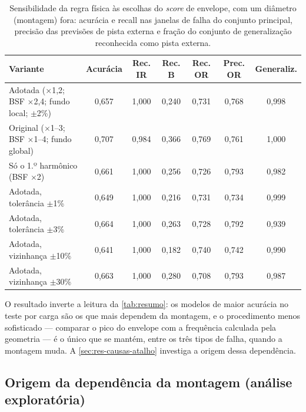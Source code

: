 \begin{table}[htb]
  \centering
  \caption{Sensibilidade da regra física às escolhas do \emph{score} de envelope,
  com um diâmetro (montagem) fora: acurácia e recall nas janelas de falha do
  conjunto principal, precisão das previsões de pista externa e fração do conjunto
  de generalização reconhecida como pista externa.}
  \label{tab:sensibilidade}
  \scriptsize
  \begin{tabular}{lcccccc}
    \toprule
    \textbf{Variante} & \textbf{Acurácia} & \textbf{Rec. IR} & \textbf{Rec. B} &
    \textbf{Rec. OR} & \textbf{Prec. OR} & \textbf{Generaliz.} \\
    \midrule
    Adotada ($\times$1,2; BSF $\times$2,4; fundo local; $\pm$2\%) & 0,657 & 1,000 & 0,240 & 0,731 & 0,768 & 0,998 \\
    Original ($\times$1--3; BSF $\times$1--4; fundo global)       & 0,707 & 0,984 & 0,366 & 0,769 & 0,761 & 1,000 \\
    Só o 1.º harmônico (BSF $\times$2)                           & 0,661 & 1,000 & 0,256 & 0,726 & 0,793 & 0,982 \\
    Adotada, tolerância $\pm$1\%                                  & 0,649 & 1,000 & 0,216 & 0,731 & 0,734 & 0,999 \\
    Adotada, tolerância $\pm$3\%                                  & 0,664 & 1,000 & 0,263 & 0,728 & 0,792 & 0,939 \\
    Adotada, vizinhança $\pm$10\%                                 & 0,641 & 1,000 & 0,182 & 0,740 & 0,742 & 0,990 \\
    Adotada, vizinhança $\pm$30\%                                 & 0,663 & 1,000 & 0,280 & 0,708 & 0,793 & 0,987 \\
    \bottomrule
  \end{tabular}
\end{table}

O resultado inverte a leitura da \autoref{tab:resumo}: os modelos de maior
acurácia no teste por carga são os que mais dependem da montagem, e o
procedimento menos sofisticado --- comparar o pico do envelope com a frequência
calculada pela geometria --- é o único que se mantém, entre os três tipos de
falha, quando a montagem muda. A \autoref{sec:res-causas-atalho} investiga a
origem dessa dependência.

\subsection{Origem da dependência da montagem (análise exploratória)}
\label{sec:res-causas-atalho}

